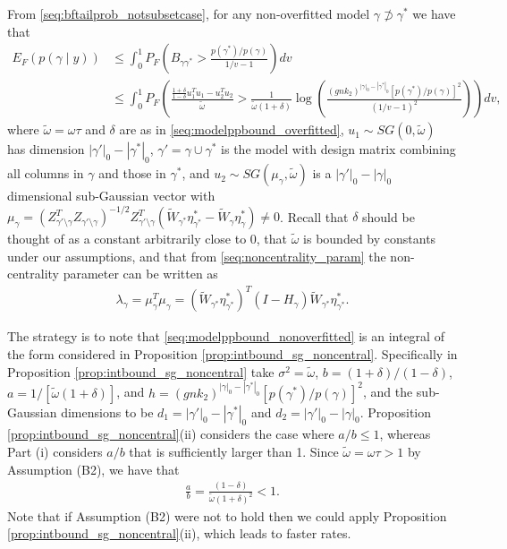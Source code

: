 From \eqref{seq:bftailprob_notsubsetcase}, for any non-overfitted model $\gamma \not\supset \gamma^*$ we have that
\begin{align}
 E_F (p(\gamma \mid y)) &\leq 
\int_0^1 P_F \left( B_{\gamma \gamma^*} > \frac{p(\gamma^*)/p(\gamma)}{1/v -1} \right) dv
\nonumber \\
&\leq \int_0^1 P_F \left( \frac{\frac{1+\delta}{1-\delta}u_1^T u_1 - u_2^T u_2}{\tilde{\omega}}  > \frac{1}{\tilde{\omega} (1 + \delta)} \log \left( \frac{(g n k_2)^{|\gamma|_0 - |\gamma^*|_0} [p(\gamma^*)/p(\gamma)]^2}{(1/v-1)^2} \right) \right) dv,
\label{seq:modelppbound_nonoverfitted}
\end{align}
where $\tilde{\omega}=\omega \tau$ and $\delta$ are as in \eqref{seq:modelppbound_overfitted},
$u_1 \sim SG(0,\tilde{\omega})$ has dimension $|\gamma'|_0 - |\gamma^*|_0$, $\gamma'= \gamma \cup \gamma^*$ is the model with design matrix combining all columns in $\gamma$ and those in $\gamma^*$, and $u_2 \sim SG(\mu_\gamma, \tilde{\omega})$ is a $|\gamma'|_0-|\gamma|_0$ dimensional sub-Gaussian vector with $\mu_\gamma= (Z_{\gamma' \setminus \gamma}^T Z_{\gamma' \setminus \gamma})^{-1/2} Z_{\gamma' \setminus \gamma}^T (\widetilde{W}_{\gamma^*} \eta_{\gamma^*}^* - \widetilde{W}_\gamma \eta_\gamma^*) \neq 0$.
Recall that $\delta$ should be thought of as a constant arbitrarily close to 0, that $\tilde{\omega}$ is bounded by constants under our assumptions, and that from \eqref{seq:noncentrality_param} the non-centrality parameter can be written as
\begin{align}
\lambda_\gamma= \mu_\gamma^T\mu_\gamma= (\widetilde{W}_{\gamma^*} \eta_{\gamma^*}^*)^T (I - H_\gamma) \widetilde{W}_{\gamma^*} \eta_{\gamma^*}^*.
\end{align}


The strategy is to note that \eqref{seq:modelppbound_nonoverfitted} is an integral of the form considered in Proposition \ref{prop:intbound_sg_noncentral}.
Specifically in Proposition \ref{prop:intbound_sg_noncentral} take
$\sigma^2= \tilde{\omega}$, $b=(1+\delta)/(1-\delta)$, $a= 1/[\tilde{\omega} (1+\delta)]$,
and $h=(g n k_2)^{|\gamma|_0 - |\gamma^*|_0} [ p(\gamma^*)/p(\gamma) ]^2$, and the sub-Gaussian dimensions to be
$d_1=|\gamma'|_0 - |\gamma^*|_0$ and $d_2=|\gamma'|_0 - |\gamma|_0$.
Proposition \ref{prop:intbound_sg_noncentral}(ii) considers the case where $a/b \leq 1$, whereas Part (i) considers $a/b$ that is sufficiently larger than 1. 
Since $\tilde{\omega}=\omega \tau > 1$ by Assumption (B2), we have that
\begin{align}
 \frac{a}{b} = \frac{(1-\delta)}{\tilde{\omega} (1+\delta)^2} < 1.
\nonumber
\end{align}
Note that if Assumption (B2) were not to hold then we could apply Proposition \ref{prop:intbound_sg_noncentral}(ii), which leads to faster rates.

